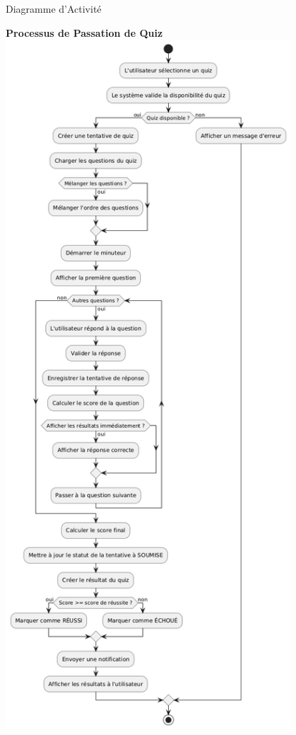 \documentclass[aspectratio=169]{beamer}
\begin{document}
\begin{frame}{Diagramme d'Activité}
    \begin{center}
        \textbf{Processus de Passation de Quiz}\\[0.5cm]
        \includegraphics[width=0.8\textwidth]{latex_media/media/activity_diagramme_passer_quiz.png}
    \end{center}
\end{frame}
\end{document}
